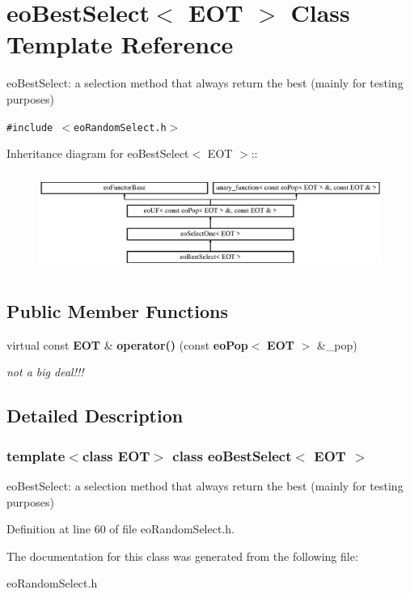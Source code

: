 \section{eo\-Best\-Select$<$ EOT $>$ Class Template Reference}
\label{classeo_best_select}
eo\-Best\-Select: a selection method that always return the best (mainly for testing purposes)  


{\tt \#include $<$eo\-Random\-Select.h$>$}

Inheritance diagram for eo\-Best\-Select$<$ EOT $>$::\begin{figure}[H]
\begin{center}
\leavevmode
\includegraphics[height=3.23699cm]{classeo_best_select}
\end{center}
\end{figure}
\subsection*{Public Member Functions}
\begin{CompactItemize}
\item 
virtual const {\bf EOT} \& {\bf operator()} (const {\bf eo\-Pop}$<$ {\bf EOT} $>$ \&\_\-pop)\label{classeo_best_select_a0}

\begin{CompactList}\small\item\em not a big deal!!! \item\end{CompactList}\end{CompactItemize}


\subsection{Detailed Description}
\subsubsection*{template$<$class EOT$>$ class eo\-Best\-Select$<$ EOT $>$}

eo\-Best\-Select: a selection method that always return the best (mainly for testing purposes) 



Definition at line 60 of file eo\-Random\-Select.h.

The documentation for this class was generated from the following file:\begin{CompactItemize}
\item 
eo\-Random\-Select.h\end{CompactItemize}
